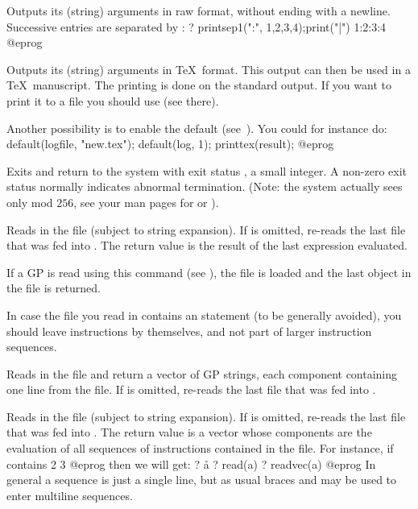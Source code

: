 \label{se:printsep1}
Outputs its (string) arguments in raw format, without ending with a
newline.  Successive entries are separated by :
\bprog
? printsep1(":", 1,2,3,4);print("|")
1:2:3:4
@eprog

\label{se:printtex}
Outputs its (string) arguments in \TeX\ format. This output can then be
used in a \TeX\ manuscript.
The printing is done on the standard output. If you want to print it to a
file you should use  (see there).

Another possibility is to enable the  default
(see~).
You could for instance do:
%
\bprog
default(logfile, "new.tex");
default(log, 1);
printtex(result);
@eprog

\label{se:quit}
Exits  and return to the system with exit status
, a small integer. A non-zero exit status normally indicates
abnormal termination. (Note: the system actually sees only
 mod $256$, see your man pages for  or ).

\label{se:read}
Reads in the file
 (subject to string expansion). If  is
omitted, re-reads the last file that was fed into . The return
value is the result of the last expression evaluated.

If a GP  is read using this command (see
), the file is loaded and the last object in the file
is returned.

In case the file you read in contains an  statement (to be
generally avoided), you should leave  instructions by themselves,
and not part of larger instruction sequences.

\label{se:readstr}
Reads in the file  and return a vector of GP strings,
each component containing one line from the file. If  is
omitted, re-reads the last file that was fed into .

\label{se:readvec}
Reads in the file
 (subject to string expansion). If  is
omitted, re-reads the last file that was fed into . The return
value is a vector whose components are the evaluation of all sequences
of instructions contained in the file. For instance, if  contains
2
3
@eprog\noindent
then we will get:
\bprog
? \r a
? read(a)
? readvec(a)
@eprog
In general a sequence is just a single line, but as usual braces and
\kbd{\bs} may be used to enter multiline sequences.

